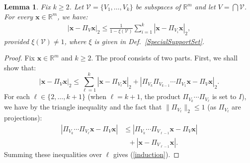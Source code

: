 \documentclass[journal, twocolumn]{IEEEtran}
\newtheorem{lemma}{Lemma}
\begin{document}
\begin{lemma}\label{DistanceToIntersectionLemma}
Fix $k \geq 2$. Let $\mathcal{V} = \{V_1, \ldots, V_k\}$ be subspaces of $\mathbb{R}^m$ and let $V = \bigcap \mathcal{V}$. For every $\mathbf{x} \in \mathbb{R}^m$, we have:
\begin{align}\label{DTILeq}
|\mathbf{x} - \Pi_V \mathbf{x}|_2 \leq \frac{1}{1 - \xi(\mathcal{V})} \sum_{i=1}^k |\mathbf{x} - \Pi_{V_i} \mathbf{x}|_2,
\end{align}
provided $\xi(\mathcal{V}) \neq 1$, where $\xi$ is given in Def.~\ref{SpecialSupportSet}.
\end{lemma}
\begin{proof} 
Fix $\mathbf{x} \in \mathbb{R}^m$ and $k \geq 2$. The proof consists of two parts. First, we shall show that: 
\begin{equation}\label{induction}
|\mathbf{x} - \Pi_V\mathbf{x}|_2 \leq \sum_{\ell=1}^k |\mathbf{x} - \Pi_{V_{\ell}} \mathbf{x}|_2 + |\Pi_{V_{k}}\Pi_{V_{k-1}}\cdots\Pi_{V_{1}} \mathbf{x} - \Pi_V \mathbf{x}|_2.
\end{equation}
For each $\ell \in \{2, \ldots, k+1\}$ (when $\ell = k+1$, the product $\Pi_{V_k} \cdots \Pi_{V_{\ell}}$ is set to $I$), we have by the triangle inequality and the fact that $\|\Pi_{V_{\ell}}\|_2 \leq 1$ (as $\Pi_{V_{\ell}}$ are projections):
\begin{align*}
|\Pi_{V_k} \cdots \Pi_{V_{\ell}}\mathbf{x} - \Pi_V \mathbf{x}|  & \leq  |\Pi_{V_k} \cdots \Pi_{V_{\ell-1}}\mathbf{x} - \Pi_V \mathbf{x}| \\
& \  \ \ + |\mathbf{x} - \Pi_{V_{\ell-1}}\mathbf{x}|.
\end{align*}
Summing these inequalities over $\ell$ gives (\ref{induction}).


\end{proof}
\end{document}

